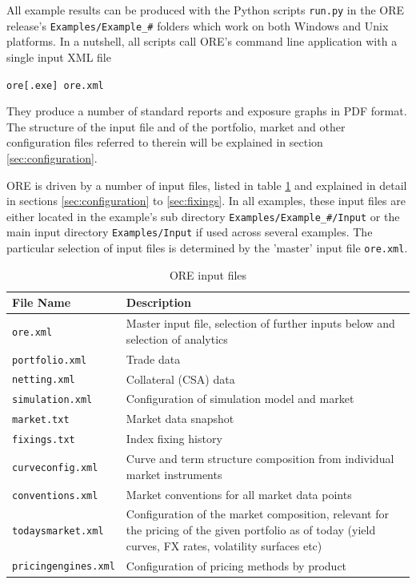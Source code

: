 \documentclass[12pt, a4paper]{article}
\begin{document}
All example results can be produced with the Python scripts {\tt run.py} in the ORE release's {\tt Examples/Example\_\#}
folders which work on both Windows and Unix platforms. In a nutshell, all scripts call ORE's command line application
with a single input XML file

\medskip
\centerline{\tt ore[.exe] ore.xml}
\medskip

They produce a number of standard reports and exposure graphs in PDF format. The structure of the input file and of the
portfolio, market and other configuration files referred to therein will be explained in section
\ref{sec:configuration}.

\medskip ORE is driven by a number of input files, listed in table \ref{tab_1} and explained in detail in sections
\ref{sec:configuration} to \ref{sec:fixings}. In all examples, these input files are either located in the example's sub
directory {\tt Examples/Example\_\#/Input} or the main input directory {\tt Examples/Input} if used across several
examples. The particular selection of input files is determined by the 'master' input file {\tt ore.xml}.

\begin{table}[h]
\scriptsize
\begin{center}
\begin{tabular}{|l|p{11cm}|}
  \hline
  File Name & Description \\
  \hline
  {\tt ore.xml}&   Master input file, selection of further inputs below and selection of analytics \\
  {\tt portfolio.xml} & Trade data \\
  {\tt netting.xml} &  Collateral (CSA) data \\
  {\tt simulation.xml} & Configuration of simulation model and market\\
  {\tt market.txt} &  Market data snapshot \\
  {\tt fixings.txt} &  Index fixing history \\
  {\tt curveconfig.xml} & Curve and term structure composition from individual market instruments\\
  {\tt conventions.xml} & Market conventions for all market data points\\
  {\tt todaysmarket.xml} &  Configuration of the market composition, relevant for the pricing of the given portfolio as
                           of today (yield curves, FX rates, volatility surfaces etc) \\
  {\tt pricingengines.xml} &  Configuration of pricing methods by product\\
  \hline
\end{tabular}
\end{center}
\caption{ORE input files}
\label{tab_1}
\end{table}
\end{document}
